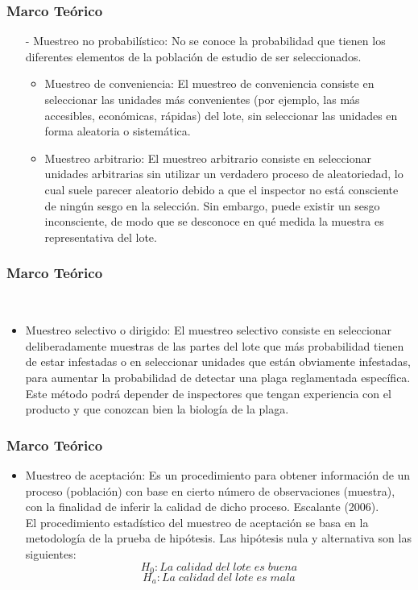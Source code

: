 \documentclass[11pt]{beamer}
\begin{document}
\begin{frame}
\frametitle{Marco Teórico}
\begin{itemize}
\item[-] Muestreo no probabilístico: No se conoce la probabilidad que tienen los diferentes elementos de la población de estudio de ser seleccionados.
\begin{itemize}
\item Muestreo de conveniencia: El muestreo de conveniencia consiste en seleccionar las unidades más convenientes (por ejemplo, las más accesibles,
económicas, rápidas) del lote, sin seleccionar las unidades en forma aleatoria o sistemática.
\item Muestreo arbitrario: El muestreo arbitrario consiste en seleccionar unidades arbitrarias sin utilizar un verdadero proceso de aleatoriedad, lo
cual suele parecer aleatorio debido a que el inspector no está consciente de ningún sesgo en la selección. Sin embargo,
puede existir un sesgo inconsciente, de modo que se desconoce en qué medida la muestra es representativa del lote.
\end{itemize}
\end{itemize}
\end{frame}

\begin{frame}
\frametitle{Marco Teórico}
\begin{itemize}
~\\
\begin{itemize}
\item Muestreo selectivo o dirigido: El muestreo selectivo consiste en seleccionar deliberadamente muestras de las partes del lote que más probabilidad
tienen de estar infestadas o en seleccionar unidades que están obviamente infestadas, para aumentar la probabilidad de
detectar una plaga reglamentada específica. Este método podrá depender de inspectores que tengan experiencia con el
producto y que conozcan bien la biología de la plaga.
\end{itemize}
\end{itemize}
\end{frame}

\begin{frame}
\frametitle{Marco Teórico}
\begin{itemize}
\item Muestreo de aceptación: Es un procedimiento para obtener información de un proceso (población) con base en cierto número de observaciones (muestra), con la finalidad de inferir la calidad de dicho proceso. Escalante (2006).
~\\El procedimiento estadístico del muestreo de aceptación se basa en la metodología de la prueba de hipótesis. Las hipótesis nula y alternativa son las siguientes:
$$H_0:La \; calidad \; del \; lote \; es \; buena$$
$$H_a:La \; calidad \; del \; lote \; es \; mala$$
\end{itemize}
\end{frame}
\end{document}
